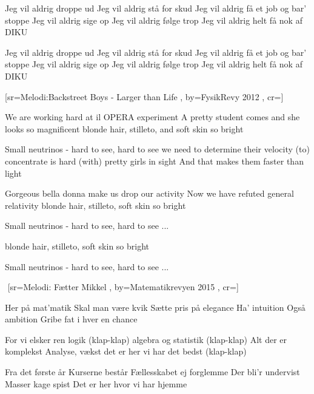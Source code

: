\documentclass[pdftex,12pt]{article}
\begin{document}
\begin{songs}{}
\endverse
\beginverse
            Jeg vil aldrig droppe ud
            Jeg vil aldrig stå for skud
            Jeg vil aldrig få et job og bar' stoppe
            Jeg vil aldrig sige op
            Jeg vil aldrig følge trop
            Jeg vil aldrig helt få nok af DIKU

\endverse
\beginverse
            Jeg vil aldrig droppe ud
            Jeg vil aldrig stå for skud
            Jeg vil aldrig få et job og bar' stoppe
            Jeg vil aldrig sige op
            Jeg vil aldrig følge trop
            Jeg vil aldrig helt få nok af DIKU

\endverse
\endsong



[sr={Melodi:Backstreet Boys - Larger than Life}
,
by={FysikRevy  2012}
,
cr={}]\hypertarget{Faster than Light}{}
\label{song23}

\beginverse
We are working hard at il OPERA experiment
A pretty student comes and she looks so magnificent
blonde hair, stilleto, and soft skin so bright

\endverse
\beginverse
Small neutrinos - hard to see, hard to see
we need to determine their velocity
(to) concentrate is hard (with) pretty girls in sight
And that makes them faster than light

\endverse
\beginverse
Gorgeous bella donna make us drop our activity
Now we have refuted general relativity
blonde hair, stilleto, soft skin so bright

\endverse
\beginverse
Small neutrinos - hard to see, hard to see ...

\endverse
\beginverse
blonde hair, stilleto, soft skin so bright

\endverse
\beginverse
Small neutrinos - hard to see, hard to see ...

\endverse
\endsong



﻿
[sr={Melodi: Fætter Mikkel}
,
by={Matematikrevyen 2015}
,
cr={}]\hypertarget{Her på mat'matik}{}
\label{song24}

\beginverse
Her på mat'matik
Skal man være kvik
Sætte pris på elegance
Ha' intuition
Også ambition
Gribe fat i hver en chance
\endverse

\beginverse
For vi elsker ren logik (klap-klap)
algebra og statistik (klap-klap)
Alt der er komplekst
Analyse, vækst
det er her vi har det bedst (klap-klap)
\endverse

\beginverse
Fra det første år
Kurserne består
Fællesskabet ej forglemme
Der bli'r undervist
Masser kage spist
Det er her hvor vi har hjemme
\endverse


\end{songs}
\end{document}
